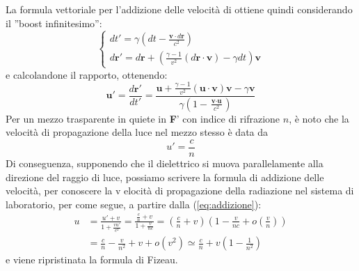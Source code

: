 \documentclass[a4paper,11pt]{book}
\theoremstyle{plain}
\theoremstyle{definition}
\begin{document}
La formula vettoriale per l'addizione delle velocità di ottiene quindi considerando il ''boost infinitesimo'':
\[
\begin{cases}
dt' = \gamma \left( dt-\frac{\textbf{v}\cdot d\textbf{r}}{c^2} \right) \\
d\textbf{r}'=d\textbf{r}+\left( \frac{\gamma-1}{v^2}(d\textbf{r}\cdot\textbf{v})-\gamma dt \right)\textbf{v}
\end{cases}
\]
e calcolandone il rapporto, ottenendo:
\[
\textbf{u}'=\frac{d\textbf{r}'}{dt'}=\frac{\textbf{u}+\frac{\gamma-1}{v^2}(\textbf{u}\cdot\textbf{v})\textbf{v}-\gamma\textbf{v}}{\gamma \left( 1-\frac{\textbf{v}\cdot \textbf{u}}{c^2} \right)}
\]
Per un mezzo trasparente in quiete in \textbf{F}' con indice di rifrazione $n$, è noto che la velocità di propagazione della luce nel mezzo stesso è data da
\[
u'=\frac{c}{n}
\]
Di conseguenza, supponendo che il dielettrico si muova parallelamente alla direzione del raggio di luce, possiamo scrivere la formula di addizione delle velocità, per conoscere la v elocità di propagazione della radiazione nel sistema di laboratorio, per come segue, a partire dalla (\ref{eq:addizione}):
\begin{align*}
u&=\frac{u'+v}{1+\frac{vu'}{c^2}}=\frac{\frac{c}{n}+v}{1+\frac{v}{nc}}=\left( \frac{c}{n}+v \right)\left( 1-\frac{v}{nc}+o\left(\frac{v}{n}\right) \right) \\
&=\frac{c}{n}-\frac{v}{n^2}+v+o(v^2) \simeq \frac{c}{n} +v\left( 1-\frac{1}{n^2} \right)
\end{align*}
e viene ripristinata la formula di Fizeau. 
\end{document}
